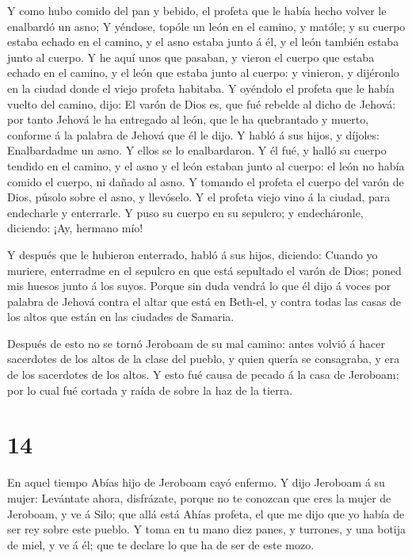  Y como hubo comido del pan y bebido, el profeta que le
había hecho volver le enalbardó un asno;  Y yéndose, topóle
un león en el camino, y matóle; y su cuerpo estaba echado en el camino,
y el asno estaba junto á él, y el león también estaba junto al cuerpo.
 Y he aquí unos que pasaban, y vieron el cuerpo que estaba
echado en el camino, y el león que estaba junto al cuerpo: y vinieron, y
dijéronlo en la ciudad donde el viejo profeta habitaba.  Y
oyéndolo el profeta que le había vuelto del camino, dijo: El varón de
Dios es, que fué rebelde al dicho de Jehová: por tanto Jehová le ha
entregado al león, que le ha quebrantado y muerto, conforme á la palabra
de Jehová que él le dijo.  Y habló á sus hijos, y díjoles:
Enalbardadme un asno. Y ellos se lo enalbardaron.  Y él
fué, y halló su cuerpo tendido en el camino, y el asno y el león estaban
junto al cuerpo: el león no había comido el cuerpo, ni dañado al asno.
 Y tomando el profeta el cuerpo del varón de Dios, púsolo
sobre el asno, y llevóselo. Y el profeta viejo vino á la ciudad, para
endecharle y enterrarle.  Y puso su cuerpo en su sepulcro;
y endecháronle, diciendo: ¡Ay, hermano mío!

 Y después que le hubieron enterrado, habló á sus hijos,
diciendo: Cuando yo muriere, enterradme en el sepulcro en que está
sepultado el varón de Dios; poned mis huesos junto á los suyos.
 Porque sin duda vendrá lo que él dijo á voces por palabra
de Jehová contra el altar que está en Beth-el, y contra todas las casas
de los altos que están en las ciudades de Samaria.

 Después de esto no se tornó Jeroboam de su mal camino:
antes volvió á hacer sacerdotes de los altos de la clase del pueblo, y
quien quería se consagraba, y era de los sacerdotes de los altos.
 Y esto fué causa de pecado á la casa de Jeroboam; por lo
cual fué cortada y raída de sobre la haz de la tierra.

\hypertarget{section-13}{%
\section{14}\label{section-13}}

 En aquel tiempo Abías hijo de Jeroboam cayó enfermo.
 Y dijo Jeroboam á su mujer: Levántate ahora, disfrázate,
porque no te conozcan que eres la mujer de Jeroboam, y ve á Silo; que
allá está Ahías profeta, el que me dijo que yo había de ser rey sobre
este pueblo.  Y toma en tu mano diez panes, y turrones, y
una botija de miel, y ve á él; que te declare lo que ha de ser de este
mozo.

